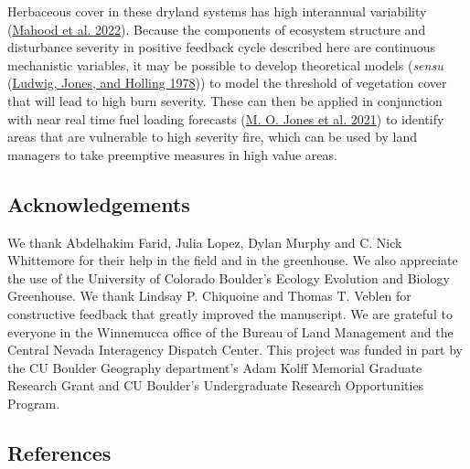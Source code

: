\documentclass[
  12pt,
]{article}
\begin{document}
Herbaceous cover in these dryland systems has high interannual
variability (\protect\hyperlink{ref-Mahood2021}{Mahood et al. 2022}).
Because the components of ecosystem structure and disturbance severity
in positive feedback cycle described here are continuous mechanistic
variables, it may be possible to develop theoretical models
(\emph{sensu} (\protect\hyperlink{ref-Ludwig1978}{Ludwig, Jones, and
Holling 1978})) to model the threshold of vegetation cover that will
lead to high burn severity. These can then be applied in conjunction
with near real time fuel loading forecasts
(\protect\hyperlink{ref-Jones2021}{M. O. Jones et al. 2021}) to identify
areas that are vulnerable to high severity fire, which can be used by
land managers to take preemptive measures in high value areas.

\hypertarget{acknowledgements}{%
\subsection{Acknowledgements}\label{acknowledgements}}

We thank Abdelhakim Farid, Julia Lopez, Dylan Murphy and C. Nick
Whittemore for their help in the field and in the greenhouse. We also
appreciate the use of the University of Colorado Boulder's Ecology
Evolution and Biology Greenhouse. We thank Lindsay P. Chiquoine and
Thomas T. Veblen for constructive feedback that greatly improved the
manuscript. We are grateful to everyone in the Winnemucca office of the
Bureau of Land Management and the Central Nevada Interagency Dispatch
Center. This project was funded in part by the CU Boulder Geography
department's Adam Kolff Memorial Graduate Research Grant and CU
Boulder's Undergraduate Research Opportunities Program.

\hypertarget{references}{%
\subsection{References}\label{references}}
\end{document}

